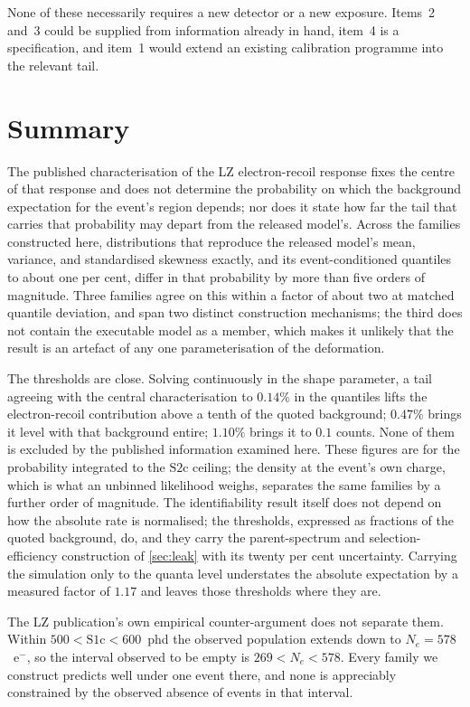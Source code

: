 \documentclass[11pt,a4paper]{article}
\begin{document}
\noindent None of these necessarily requires a new detector or a new
exposure. Items~2 and~3 could be supplied from information already in
hand, item~4 is a specification, and item~1 would extend an existing
calibration programme into the relevant tail.

\section{Summary}

The published characterisation of the LZ electron-recoil response fixes
the centre of that response and does not determine the probability on
which the background expectation for the event's region depends; nor
does it state how far the tail that carries that probability may depart
from the released model's. Across the families constructed here,
distributions that reproduce the released model's mean, variance, and
standardised skewness exactly, and its event-conditioned quantiles to
about one per cent, differ in that probability by more than five orders
of magnitude. Three families agree on this within a factor of about two
at matched quantile deviation, and span two distinct construction
mechanisms; the third does not contain the executable model as a member,
which makes it unlikely that the result is an artefact of any one
parameterisation of the deformation.

The thresholds are close. Solving continuously in the shape parameter, a
tail agreeing with the central characterisation to \(0.14\%\) in the
quantiles lifts the electron-recoil contribution above a tenth of the
quoted background; \(0.47\%\) brings it level with that background
entire; \(1.10\%\) brings it to \(0.1\) counts. None of them is excluded
by the published information examined here. These figures are for the
probability integrated to the \(\mathrm{S2c}\) ceiling; the density at
the event's own charge, which is what an unbinned likelihood weighs,
separates the same families by a further order of magnitude. The
identifiability result itself does not depend on how the absolute rate
is normalised; the thresholds, expressed as fractions of the quoted
background, do, and they carry the parent-spectrum and
selection-efficiency construction of \cref{sec:leak} with its twenty per
cent uncertainty. Carrying the simulation only to the quanta level
understates the absolute expectation by a measured factor of \(1.17\)
and leaves those thresholds where they are.

The LZ publication's own empirical counter-argument does not separate
them. Within \(500<\mathrm{S1c}<600\)~phd the observed population
extends down to \(N_e=578\)~e\(^-\), so the interval observed to be
empty is \(269<N_e<578\). Every family we construct predicts well under
one event there, and none is appreciably constrained by the observed
absence of events in that interval.
\end{document}

